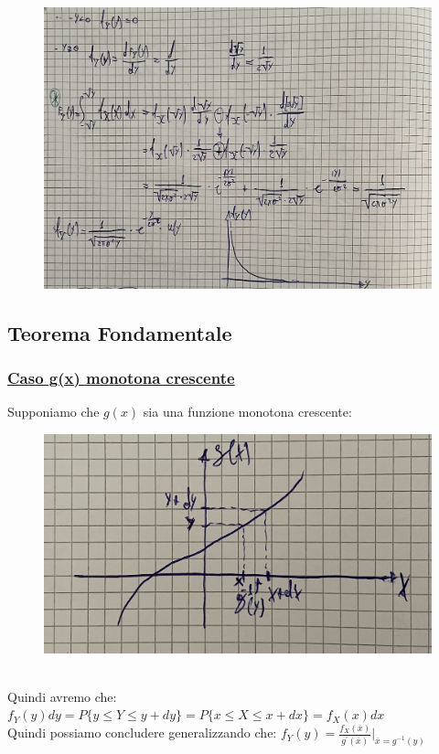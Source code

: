 \documentclass{article}
\begin{document}
\begin{figure}[ht]
\centering
\includegraphics[scale=0.13]{ese/17b.jpeg}
\end{figure} 
\clearpage
\subsection{Teorema Fondamentale}
\subsubsection{\underline{Caso g(x) monotona crescente}}
Supponiamo che $g(x)$ sia una funzione monotona crescente:
\begin{figure}[ht]
\centering
\includegraphics[scale=0.13]{images/42.TeoFondMonoCresc.jpeg}
\end{figure} ~\\
Quindi avremo che: \\
$f_Y(y) dy = P \big\{ y \leq Y \leq y+ dy \big\} = P \big\{ x \leq X \leq x+ dx \big\} = f_X(x) dx$ \\
Quindi possiamo concludere generalizzando che: $f_Y(y) = \frac{f_X(\overline x)}{g^{'}(\overline x)} \bigg|_{\overline x = g^{-1}(y)}$
\end{document}
